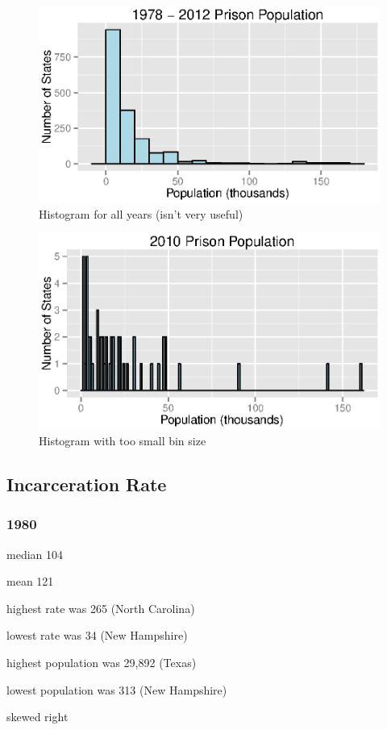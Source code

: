 \documentclass{exam}
\begin{document}
  \begin{figure}[H]
    \centering
    \includegraphics[scale = 0.9]{figures/population_histogram_all_years.eps}
    \caption{Histogram for all years (isn't very useful)}
  \end{figure}

  \begin{figure}[H]
    \centering
    \includegraphics[scale = 0.9]{figures/population_histogram_2010_small_bins.eps}
    \caption{Histogram with too small bin size}
  \end{figure}

  \subsection{Incarceration Rate}

  \subsubsection{1980}

  \begin{itemize*}
    \item median 104
    \item mean 121
    \item highest rate was 265 (North Carolina)
    \item lowest rate was 34 (New Hampshire)
    \item highest population was 29,892 (Texas)
    \item lowest population was 313 (New Hampshire)
    \item skewed right
  \end{itemize*}
\end{document}
